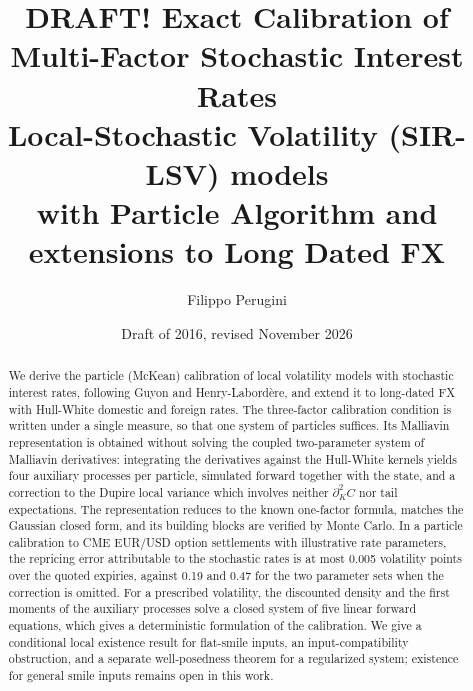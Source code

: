 \documentclass[12pt,a4paper]{article}
\author{Filippo Perugini}
\title{DRAFT! Exact Calibration of\\ Multi-Factor Stochastic Interest Rates \\
Local-Stochastic Volatility  (SIR-LSV) models \\ with Particle Algorithm and extensions to Long Dated FX}
\date{Draft of 2016, revised November 2026}
\theoremstyle{plain}
\theoremstyle{definition}
\theoremstyle{remark}
\begin{document}
\maketitle

\begin{abstract}
We derive the particle (McKean) calibration of local volatility models with stochastic interest rates, following Guyon and Henry-Labord\`ere, and extend it to long-dated FX with Hull-White domestic and foreign rates. The three-factor calibration condition is written under a single measure, so that one system of particles suffices. Its Malliavin representation is obtained without solving the coupled two-parameter system of Malliavin derivatives: integrating the derivatives against the Hull-White kernels yields four auxiliary processes per particle, simulated forward together with the state, and a correction to the Dupire local variance which involves neither $\partial_K^2C$ nor tail expectations. The representation reduces to the known one-factor formula, matches the Gaussian closed form, and its building blocks are verified by Monte Carlo. In a particle calibration to CME EUR/USD option settlements with illustrative rate parameters, the repricing error attributable to the stochastic rates is at most 0.005 volatility points over the quoted expiries, against 0.19 and 0.47 for the two parameter sets when the correction is omitted. For a prescribed volatility, the discounted density and the first moments of the auxiliary processes solve a closed system of five linear forward equations, which gives a deterministic formulation of the calibration. We give a conditional local existence result for flat-smile inputs, an input-compatibility obstruction, and a separate well-posedness theorem for a regularized system; existence for general smile inputs remains open in this work.
\end{abstract}

\tableofcontents












\appendix




\end{document}
